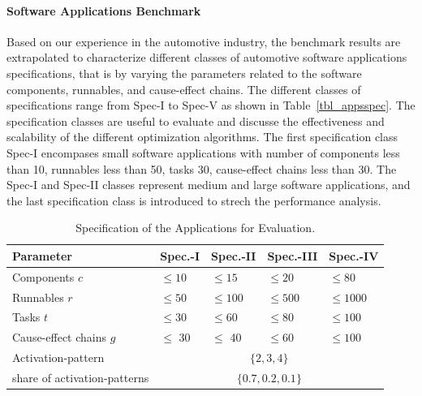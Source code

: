 \paragraph{Software Applications Benchmark} Based on our experience in the automotive industry, the benchmark results  are extrapolated to characterize different classes of automotive software applications specifications, that is by varying the parameters related to the software components, runnables, and cause-effect chains. The different classes of specifications range from Spec-I to Spec-V as shown in Table~\ref{tbl_appsspec}. The specification classes are useful to evaluate and discusse the effectiveness and scalability of the different optimization algorithms. The first specification class Spec-I encompases small software applications with number of components less than 10, runnables less than 50, tasks 30, cause-effect chains less than 30. The Spec-I and Spec-II classes represent medium and large software applications, and the last specification class is introduced to strech the performance analysis. 
\begin{table}
\centering\small
\begin{tabular}{@{}lllll@{}}
\toprule
Parameter  		& Spec.-I  & Spec.-II & Spec.-III & Spec.-IV\\
\midrule
Components $c$		& $\leq 10$	& $\leq 15$ 	&$\leq 20$ & $\leq 80$\\ 
Runnables $r$		& $\leq 50$	& $\leq 100$ 	& $\leq 500$&$\leq 1000$\\
Tasks $t$ 			& $\leq 30$ & $\leq 60$ 	& $\leq 80$&$\leq 100$\\
Cause-effect chains $g$ & $\leq$ 30 & $\leq$ 40 & $\leq 60$&$\leq100$\\ \midrule
Activation-pattern	& \multicolumn{4}{c}{$\{2,3,4\}$}\\ \midrule
share of activation-patterns	& \multicolumn{4}{c}{$\{0.7, 0.2, 0.1\}$}\\
\bottomrule
\end{tabular}
\caption{Specification of the Applications for Evaluation.}
\label{tbl_app_ranges}
\end{table}

